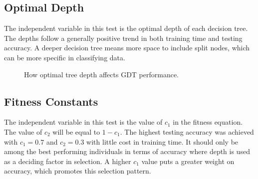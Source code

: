 \documentclass[12pt]{article}
\begin{document}
\subsection{Optimal Depth}

The independent variable in this test is the optimal depth of each decision tree. The depths follow a generally positive trend in both training time and testing accuracy. A deeper decision tree means more space to include split nodes, which can be more specific in classifying data.

\begin{figure}[H]
    \centering
    \caption{How optimal tree depth affects GDT performance.}
\end{figure}

\subsection{Fitness Constants}

The independent variable in this test is the value of $c_1$ in the fitness equation. The value of $c_2$ will be equal to $1 - c_1$. The highest testing accuracy was achieved with $c_1 = 0.7$ and $c_2 = 0.3$ with little cost in training time. It should only be among the best performing individuals in terms of accuracy where depth is used as a deciding factor in selection. A higher $c_1$ value puts a greater weight on accuracy, which promotes this selection pattern.
\end{document}
